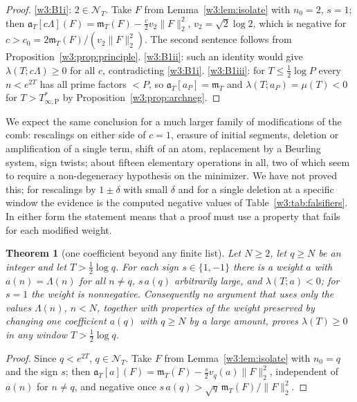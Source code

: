\documentclass[11pt]{amsart}
\newtheorem{theorem}{Theorem}[section]
\theoremstyle{definition}
\theoremstyle{remark}
\numberwithin{equation}{section}
\newcommand{\NT}{\mathcal{N}_T}                        %
\newcommand{\mT}{\mathfrak{m}_T}                       %
\newcommand{\aT}{\mathfrak{a}_T}                       %
\newcommand{\lam}{\lambda(T)}                          %
\newcommand{\Tarch}{T^{*}_{\infty,\mathrm P}}          %
\begin{document}
\begin{proof}
\ref{w3:B1i}: $2\in\NT$. Take $F$ from Lemma~\ref{w3:lem:isolate} with $n_0=2$, $s=1$; then
$\aT[c\Lambda](F)=\mT(F)-\frac c2v_2\|F\|_2^2$, $v_2=\sqrt2\log2$, which is negative for
$c>c_0=2\mT(F)/(v_2\|F\|_2^2)$. The second sentence follows from Proposition~\ref{w3:prop:principle}.
\ref{w3:B1ii}: such an identity would give $\lambda(T;c\Lambda)\ge0$ for all $c$, contradicting \ref{w3:B1i}.
\ref{w3:B1iii}: for $T\le\frac12\log P$ every $n<e^{2T}$ has all prime factors $<P$, so $\aT[a_P]=\mT$ and
$\lambda(T;a_P)=\mu(T)<0$ for $T>\Tarch$ by Proposition~\ref{w3:prop:archneg}.
\end{proof}

We expect the same conclusion for a much larger family
of modifications of the comb: rescalings on either side of $c=1$, erasure of initial segments, deletion or
amplification of a single term, shift of an atom, replacement by a Beurling system, sign twists; about fifteen
elementary operations in all, two of which seem to require a non-degeneracy hypothesis on the minimizer. We have
not proved this; for rescalings by $1\pm\delta$ with small $\delta$ and for a single deletion at a specific window
the evidence is the computed negative values of Table~\ref{w3:tab:falsifiers}. In either form the statement means
that a proof must use a property that fails for each modified weight.

\begin{theorem}[one coefficient beyond any finite list]\label{w3:bar:B11}
Let $N\ge2$, let $q\ge N$ be an integer and let $T>\frac12\log q$. For each sign $s\in\{1,-1\}$ there is a weight
$a$ with $a(n)=\Lambda(n)$ for all $n\ne q$, $s\,a(q)$ arbitrarily large, and $\lambda(T;a)<0$; for $s=1$ the
weight is nonnegative. Consequently no argument that uses only the values $\Lambda(n)$, $n<N$, together with
properties of the weight preserved by changing one coefficient $a(q)$ with $q\ge N$ by a large amount, proves
$\lam\ge0$ in any window $T>\frac12\log q$.
\end{theorem}

\begin{proof}
Since $q<e^{2T}$, $q\in\NT$. Take $F$ from Lemma~\ref{w3:lem:isolate} with $n_0=q$ and the sign $s$; then
$\aT[a](F)=\mT(F)-\frac s2v_q(a)\|F\|_2^2$, independent of $a(n)$ for $n\ne q$, and negative once
$s\,a(q)>\sqrt q\,\mT(F)/\|F\|_2^2$.
\end{proof}
\end{document}
